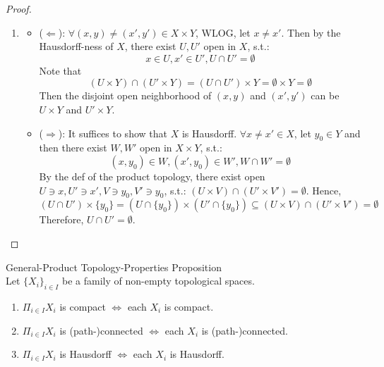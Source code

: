 \begin{proof}
\begin{enumerate}
        \item \begin{itemize}
            \item ($\Leftarrow$): $\forall (x,y) \neq (x',y') \in X \times Y$, WLOG, let $x\neq x'$. Then by the Hausdorff-ness of $X$, there exist $U,U'$ open in $X$, s.t.:
            $$x \in U ,x'\in U', U\cap U' = \emptyset$$
            Note that
            $$(U \times Y) \cap (U' \times Y) = (U \cap U') \times Y = \emptyset \times Y =\emptyset$$
            Then the disjoint open neighborhood of $(x,y)$ and $(x',y')$ can be $U \times Y$ and $U' \times Y$.
            \item ($\Rightarrow$): It suffices to show that $X$ is Hausdorff. $\forall x \neq x' \in X$, let $y_0 \in Y$ and then there exist $W,W'$ open in $X \times Y$, s.t.:
            $$(x,y_0) \in W, (x',y_0) \in W', W\cap W'=\emptyset$$
            By the def of the product topology, there exist open $U \ni x, U'\ni x', V\ni y_0,V'\ni y_0$, s.t.: $(U \times V) \cap (U' \times V') = \emptyset$. Hence,
            $$(U\cap U') \times \{y_0\} = (U \cap \{y_0\}) \times (U' \cap \{y_0\}) \subseteq (U\times V) \cap (U'\times V') = \emptyset$$
            Therefore, $U \cap U' = \emptyset$.
        \end{itemize}
    \end{enumerate}
\end{proof}

\begin{proposition}{General-Product Topology-Properties Proposition}\\
Let $\{X_i\}_{i \in I}$ be a family of non-empty topological spaces.
\begin{enumerate}
    \item $\Pi_{i \in I}X_i$ is compact $\Leftrightarrow$ each $X_i$ is compact.
    \item $\Pi_{i \in I}X_i$ is (path-)connected $\Leftrightarrow$ each $X_i$ is (path-)connected.
    \item $\Pi_{i \in I}X_i$ is Hausdorff $\Leftrightarrow$ each $X_i$ is Hausdorff.
\end{enumerate}
\end{proposition}

